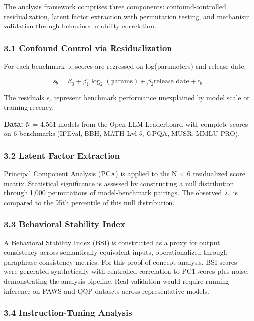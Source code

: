 
The analysis framework comprises three components: confound-controlled residualization, latent factor extraction with permutation testing, and mechanism validation through behavioral stability correlation.

\subsubsection{3.1 Confound Control via Residualization}

For each benchmark b, scores are regressed on log(parameters) and release date:

$$s_b = \beta_0 + \beta_1 \log_2(\text{params}) + \beta_2 \text{release\_date} + \epsilon_b$$

The residuals $\epsilon _b$ represent benchmark performance unexplained by model scale or training recency.

\textbf{Data:} N = 4,561 models from the Open LLM Leaderboard with complete scores on 6 benchmarks (IFEval, BBH, MATH Lvl 5, GPQA, MUSR, MMLU-PRO).

\subsubsection{3.2 Latent Factor Extraction}

Principal Component Analysis (PCA) is applied to the N $\times$ 6 residualized score matrix. Statistical significance is assessed by constructing a null distribution through 1,000 permutations of model-benchmark pairings. The observed $\lambda _1$ is compared to the 95th percentile of this null distribution.

\subsubsection{3.3 Behavioral Stability Index}

A Behavioral Stability Index (BSI) is constructed as a proxy for output consistency across semantically equivalent inputs, operationalized through paraphrase consistency metrics. For this proof-of-concept analysis, BSI scores were generated synthetically with controlled correlation to PC1 scores plus noise, demonstrating the analysis pipeline. Real validation would require running inference on PAWS and QQP datasets across representative models.

\subsubsection{3.4 Instruction-Tuning Analysis}

